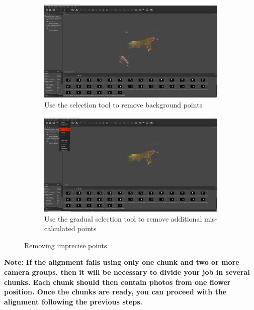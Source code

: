 \documentclass[10pt,letter,english]{article}
\begin{document}
\begin{figure}[H]
\begin{subfigure}[t]{.45\textwidth}
  \centering
  \includegraphics[width=1\textwidth]{Figures/metashape_delete_selectedpoints.png}
  \caption{Use the selection tool to remove background points}
  \label{model_orientation1}
\end{subfigure}%
\hfill
\begin{subfigure}[t]{.45\textwidth}
  \centering
  \includegraphics[width=1\textwidth]{Figures/metashape_gradual_selection.png}
  \caption{Use the gradual selection tool to remove additional mis-calculated points}
  \label{model_orientation2}
\end{subfigure}
\caption{Removing imprecise points}
\label{removing_points}
\end{figure}


\noindent \textbf{Note: If the alignment fails using only one chunk and two or more camera groups, then it will be necessary to divide your job in several chunks. Each chunk should then contain photos from one flower position. Once the chunks are ready, you can proceed with the alignment following the previous steps.}
\end{document}
